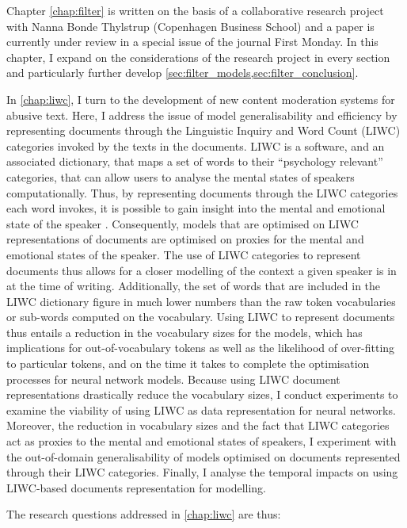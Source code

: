 Chapter \ref{chap:filter} is written on the basis of a collaborative research project with Nanna Bonde Thylstrup (Copenhagen Business School) and a paper is currently under review in a special issue of the journal First Monday.
In this chapter, I expand on the considerations of the research project in every section and particularly further develop \cref{sec:filter_models,sec:filter_conclusion}.

In \cref{chap:liwc}, I turn to the development of new content moderation systems for abusive text.
Here, I address the issue of model generalisability and efficiency by representing documents through the Linguistic Inquiry and Word Count (LIWC) categories invoked by the texts in the documents.
LIWC is a software, and an associated dictionary, that maps a set of words to their ``psychology relevant'' categories, that can allow users to analyse the mental states of speakers computationally.
Thus, by representing documents through the LIWC categories each word invokes, it is possible to gain insight into the mental and emotional state of the speaker \citep{Pennebaker:2001}.
Consequently, models that are optimised on LIWC representations of documents are optimised on proxies for the mental and emotional states of the speaker.
The use of LIWC categories to represent documents thus allows for a closer modelling of the context a given speaker is in at the time of writing.
Additionally, the set of words that are included in the LIWC dictionary figure in much lower numbers than the raw token vocabularies or sub-words computed on the vocabulary.
Using LIWC to represent documents thus entails a reduction in the vocabulary sizes for the models, which has implications for out-of-vocabulary tokens as well as the likelihood of over-fitting to particular tokens, and on the time it takes to complete the optimisation processes for neural network models.
Because using LIWC document representations drastically reduce the vocabulary sizes, I conduct experiments to examine the viability of using LIWC as data representation for neural networks.
Moreover, the reduction in vocabulary sizes and the fact that LIWC categories act as proxies to the mental and emotional states of speakers, I experiment with the out-of-domain generalisability of models optimised on documents represented through their LIWC categories.
Finally, I analyse the temporal impacts on using LIWC-based documents representation for modelling.

The research questions addressed in \cref{chap:liwc} are thus:

